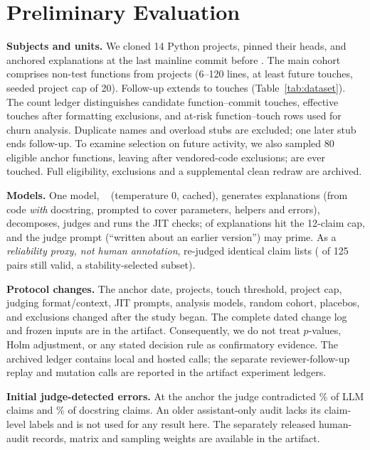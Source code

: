 \section{Preliminary Evaluation}\label{sec:eval}

\textbf{Subjects and units.} We cloned 14 Python projects, pinned their heads, and anchored explanations at the last mainline commit before \XAnchorDate{}. The main cohort comprises \XNFunctions{} non-test functions from \XNRepos{} projects (6--120 lines, at least \XMinTouches{} future touches, seeded project cap of 20). Follow-up extends to \XKMax{} touches (Table~\ref{tab:dataset}). The count ledger distinguishes \XNPairs{} candidate function--commit touches, \XNEffectivePairs{} effective touches after formatting exclusions, and \XHOneNPairs{} at-risk function--touch rows used for churn analysis. Duplicate names and overload stubs are excluded; one later stub ends follow-up. To examine selection on future activity, we also sampled 80 eligible anchor functions, leaving \XNRandom{} after vendored-code exclusions; \XNRandomTouched{} are ever touched. Full eligibility, exclusions and a supplemental clean redraw are archived.

\textbf{Models.} One model, \XBulkModel{}~\cite{hui2024qwen25coder} (temperature 0, cached), generates explanations (from code \emph{with} docstring, prompted to cover parameters, helpers and errors), decomposes, judges and runs the JIT checks; \XNExplAtClaimCap{} of \XNFunctions{} explanations hit the 12-claim cap, and the judge prompt (``written about an earlier version'') may prime. As a \emph{reliability proxy, not human annotation}, \XSecondModel{} re-judged identical claim lists (\XAJudgePairsValid{} of 125 pairs still valid, a stability-selected subset).

\textbf{Protocol changes.} The anchor date, projects, touch threshold, project cap, judging format/context, JIT prompts, analysis models, random cohort, placebos, and exclusions changed after the study began. The complete dated change log and frozen inputs are in the artifact. Consequently, we do not treat $p$-values, Holm adjustment, or any stated decision rule as confirmatory evidence. The archived ledger contains \XNOllamaCalls{} local and \XNAnthropicCalls{} hosted calls; the separate reviewer-follow-up replay and mutation calls are reported in the artifact experiment ledgers.



\textbf{Initial judge-detected errors.} At the anchor the judge contradicted \XAnchorContradictedPctLlm\% of LLM claims and \XAnchorContradictedPctDoc\% of docstring claims. An older assistant-only audit lacks its claim-level labels and is not used for any result here. The separately released human-audit records, matrix and sampling weights are available in the artifact.

